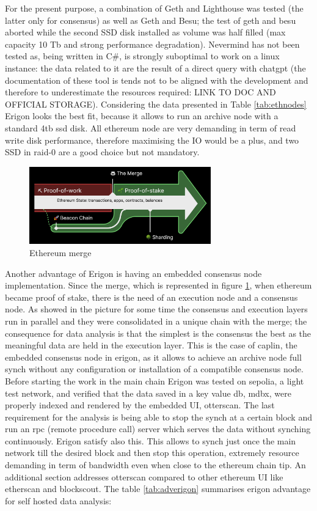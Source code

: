 \documentclass[11pt,a4paper,titlepage]{scrartcl}
\begin{document}
For the present purpose, a combination of Geth and Lighthouse was tested  (the latter only for consensus) as well as  Geth and Besu; the test of geth and besu aborted while the  second SSD disk installed as volume was half filled (max capacity 10 Tb and strong performance degradation).  Nevermind has not been tested as, being written in C\#, is strongly suboptimal to work on a linux instance: the data related to it are the result of a direct query with chatgpt (the documentation of these tool is tends not to be aligned with the development and therefore to underestimate the resources required: LINK TO DOC AND OFFICIAL STORAGE).
Considering the data presented in Table \ref{tab:ethnodes} Erigon looks the best fit, because it allows to run an archive node with a standard 4tb ssd disk. All ethereum node are very demanding in term of read write disk performance, therefore maximising the IO would be a plus, and two SSD in raid-0 are a good choice but not mandatory. 
\begin{figure}[ht]
    \includegraphics[width=0.7\textwidth]{image/powpos.png}
    \caption{Ethereum merge}
    \label{fig:powpos}
\end{figure}

Another advantage of Erigon is having an embedded consensus node implementation. Since the merge, which is represented in figure \ref{fig:powpos}, when ethereum became proof of stake, there is the need of an execution node and a consensus node. As showed in the picture for some time the consensus and execution layers run in parallel and they were consolidated in a unique chain with the merge; the consequence  for data analysis is that  the simplest is the consensus the best as the meaningful data are held in the execution layer. This is the case of caplin, the embedded consensus node in erigon, as it allows to achieve an archive node full synch without any configuration or installation of a compatible consensus node.
Before starting the work in the main chain  Erigon was tested on sepolia, a light test network, and verified that the data saved in a key value db, mdbx, were properly indexed and rendered by the embedded UI, otterscan. The last requirement for the analysis is being able to stop the synch at a certain block and run an rpc (remote procedure call) server which serves the data without synching continuously. Erigon satisfy also this. This allows to synch just once the main network till the desired block and then stop this operation, extremely resource demanding in term of bandwidth even when close to the ethereum chain tip.
An additional section addresses otterscan compared to other ethereum UI like etherscan and blockscout.
The table \ref{tab:adverigon} summarises erigon advantage for self hosted data analysis:
\end{document}
